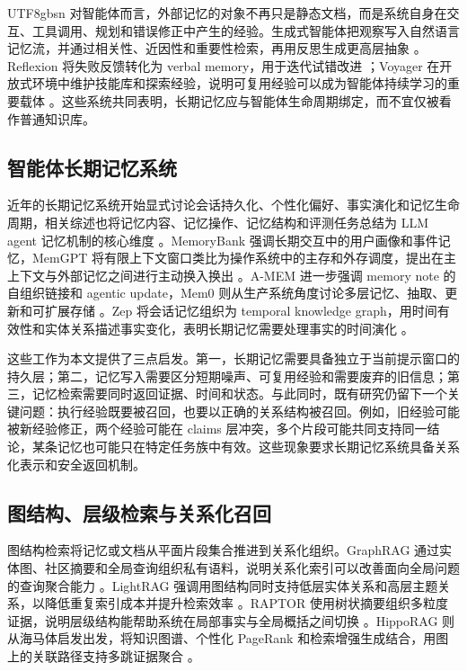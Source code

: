 \documentclass[a4paper,fleqn]{cas-sc}
\begin{document}
\begin{CJK*}{UTF8}{gbsn}
对智能体而言，外部记忆的对象不再只是静态文档，而是系统自身在交互、工具调用、规划和错误修正中产生的经验。生成式智能体把观察写入自然语言记忆流，并通过相关性、近因性和重要性检索，再用反思生成更高层抽象 \citep{park2023generative}。Reflexion 将失败反馈转化为 verbal memory，用于迭代试错改进 \citep{shinn2023reflexion}；Voyager 在开放式环境中维护技能库和探索经验，说明可复用经验可以成为智能体持续学习的重要载体 \citep{wang2023voyager}。这些系统共同表明，长期记忆应与智能体生命周期绑定，而不宜仅被看作普通知识库。

\subsection{智能体长期记忆系统}

近年的长期记忆系统开始显式讨论会话持久化、个性化偏好、事实演化和记忆生命周期，相关综述也将记忆内容、记忆操作、记忆结构和评测任务总结为 LLM agent 记忆机制的核心维度 \citep{zhang2024memorysurvey}。MemoryBank 强调长期交互中的用户画像和事件记忆，MemGPT 将有限上下文窗口类比为操作系统中的主存和外存调度，提出在主上下文与外部记忆之间进行主动换入换出 \citep{zhong2024memorybank,packer2023memgpt}。A-MEM 进一步强调 memory note 的自组织链接和 agentic update，Mem0 则从生产系统角度讨论多层记忆、抽取、更新和可扩展存储 \citep{xu2025amem,chhikara2025mem0}。Zep 将会话记忆组织为 temporal knowledge graph，用时间有效性和实体关系描述事实变化，表明长期记忆需要处理事实的时间演化 \citep{rasmussen2025zep}。

这些工作为本文提供了三点启发。第一，长期记忆需要具备独立于当前提示窗口的持久层；第二，记忆写入需要区分短期噪声、可复用经验和需要废弃的旧信息；第三，记忆检索需要同时返回证据、时间和状态。与此同时，既有研究仍留下一个关键问题：执行经验既要被召回，也要以正确的关系结构被召回。例如，旧经验可能被新经验修正，两个经验可能在 claims 层冲突，多个片段可能共同支持同一结论，某条记忆也可能只在特定任务族中有效。这些现象要求长期记忆系统具备关系化表示和安全返回机制。

\subsection{图结构、层级检索与关系化召回}

图结构检索将记忆或文档从平面片段集合推进到关系化组织。GraphRAG 通过实体图、社区摘要和全局查询组织私有语料，说明关系化索引可以改善面向全局问题的查询聚合能力 \citep{edge2024graphrag}。LightRAG 强调用图结构同时支持低层实体关系和高层主题关系，以降低重复索引成本并提升检索效率 \citep{guo2024lightrag}。RAPTOR 使用树状摘要组织多粒度证据，说明层级结构能帮助系统在局部事实与全局概括之间切换 \citep{sarthi2024raptor}。HippoRAG 则从海马体启发出发，将知识图谱、个性化 PageRank 和检索增强生成结合，用图上的关联路径支持多跳证据聚合 \citep{gutierrez2024hipporag}。


\end{CJK*}
\end{document}
